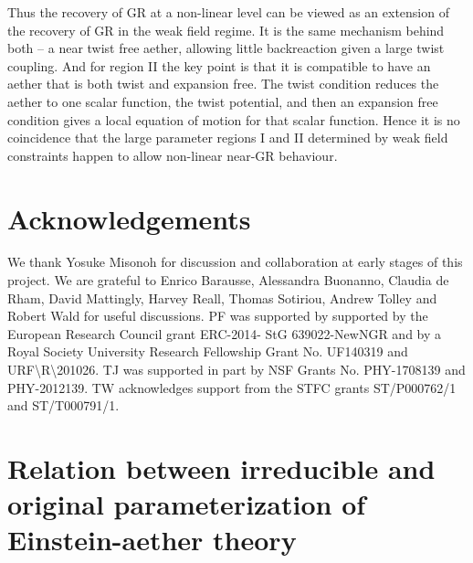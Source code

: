 \documentclass[12pt]{article}
\numberwithin{equation}{section}
\begin{document}
Thus the recovery of GR at a non-linear level 
can
be viewed as an extension of the recovery of GR in the weak field regime. It is the same mechanism behind both -- a near twist free aether, allowing little backreaction given a large twist coupling. And for region II the key point is that it is compatible to have an aether that is both twist and expansion free. The twist condition reduces the aether to one scalar function, the twist potential, and then an expansion free condition gives a local equation of motion for that scalar function. 
Hence it is no coincidence that the large parameter regions I and II determined by weak field constraints happen to allow non-linear near-GR behaviour. 



\section*{Acknowledgements}
We thank Yosuke Misonoh for discussion and collaboration at early stages of this project. We are grateful to Enrico Barausse, Alessandra Buonanno,
Claudia de Rham, David Mattingly, Harvey Reall, Thomas Sotiriou, Andrew Tolley and Robert Wald 
for useful discussions.
PF was supported by supported by the European Research Council grant ERC-2014- StG 639022-NewNGR and by a Royal Society University Research Fellowship Grant No. UF140319 and URF\textbackslash R\textbackslash 201026.
TJ was supported in part by 
NSF Grants No. PHY-1708139 and PHY-2012139.
TW acknowledges support from the STFC grants ST/P000762/1 and ST/T000791/1.



\newpage
\appendix 



\section{Relation between irreducible and original parameterization of Einstein-aether theory}
\label{app:aetherTheory}
\end{document}
